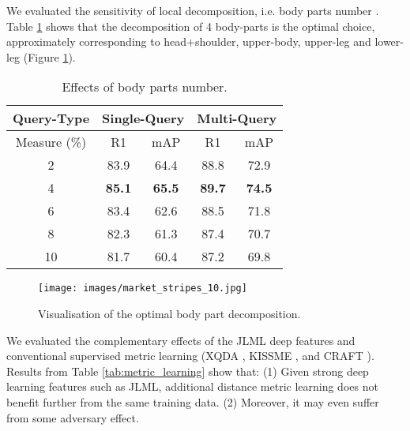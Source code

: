 \documentclass{article}
\begin{document}
{We evaluated the sensitivity of local decomposition,
	i.e. body parts number . 
	Table \ref{tab:num_body_part} shows that the decomposition of 4 body-parts is the optimal choice, approximately corresponding to head+shoulder, upper-body, upper-leg and lower-leg (Figure \ref{fig:local_parts}).}

\begin{table} [h]
	\centering
	\footnotesize
\renewcommand{\arraystretch}{1}
	\setlength{\tabcolsep}{0.4 cm}
	\vspace{-0.3cm}
	\caption{\footnotesize
		Effects of body parts number.
	}
	\vskip 0pt \begin{tabular}{|c|cc|cc|}
		\hline
Query-Type &  \multicolumn{2}{c|}{Single-Query} &\multicolumn{2}{c|}{Multi-Query} \\ \hline
		Measure (\%)     
		& R1 & mAP & R1 & mAP  \\ \hline \hline
		2 & 83.9 & 64.4 & 88.8 & 72.9 \\ \hline
		4 & \bf 85.1 &  \bf 65.5  &  \bf 89.7 & \bf 74.5 \\\hline
		6 & 83.4 &  62.6  &  88.5 & 71.8 \\\hline
		8 &  82.3 &  61.3  &  87.4 & 70.7 \\\hline
		10 &  81.7 &  60.4  &  87.2 & 69.8 \\
		\hline
	\end{tabular}\label{tab:num_body_part}
	\vspace{-0.3cm}
\end{table}

\begin{figure}[h]
	\centering
    \texttt{[image: images/market\_stripes\_10.jpg]}
\vskip -0.3cm
	\caption{\footnotesize 
		Visualisation of the optimal body part decomposition.
	}
	\label{fig:local_parts}
\end{figure}



\vspace{0.1cm}
{We evaluated the complementary effects of the JLML deep features
	and conventional supervised metric learning (XQDA \cite{liao2015person},
	KISSME \cite{KISSME_CVPR12}, and CRAFT \cite{chen2017person}). 
	Results from Table \ref{tab:metric_learning} show that:
	(1) Given strong deep learning features such as JLML, 
	additional distance metric learning does not benefit further from the same training data. 
	(2) Moreover, it may even suffer from some adversary effect.}
\end{document}
